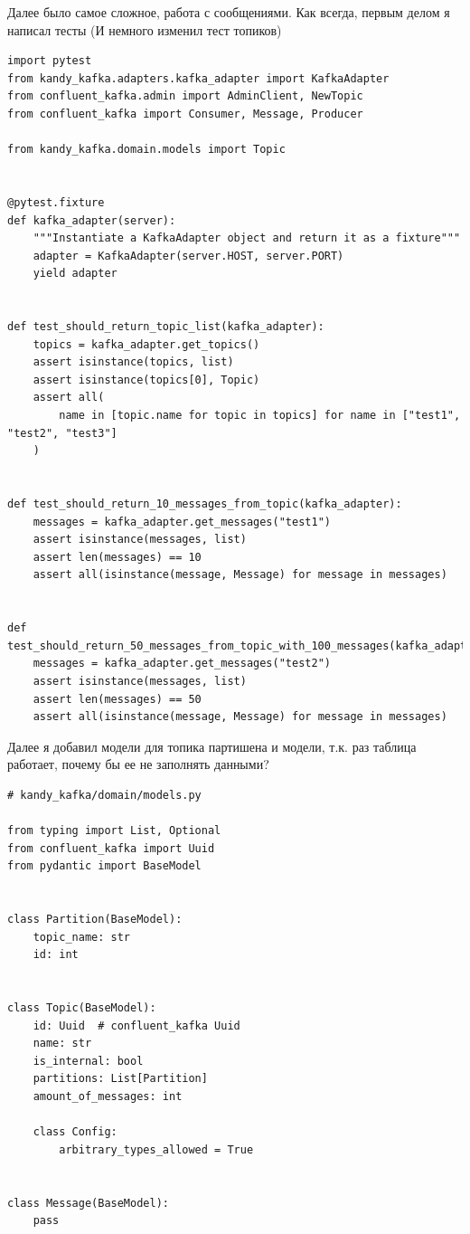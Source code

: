 \documentclass[10pt , a4paper]{report}
\newenvironment{code}{\captionsetup{type=listing}}{}
\begin{document}
Далее было самое сложное, работа с сообщениями. Как всегда, первым делом я написал тесты (И немного изменил тест топиков)

\begin{code}
  \begin{verbatim}
import pytest
from kandy_kafka.adapters.kafka_adapter import KafkaAdapter
from confluent_kafka.admin import AdminClient, NewTopic
from confluent_kafka import Consumer, Message, Producer

from kandy_kafka.domain.models import Topic


@pytest.fixture
def kafka_adapter(server):
    """Instantiate a KafkaAdapter object and return it as a fixture"""
    adapter = KafkaAdapter(server.HOST, server.PORT)
    yield adapter


def test_should_return_topic_list(kafka_adapter):
    topics = kafka_adapter.get_topics()
    assert isinstance(topics, list)
    assert isinstance(topics[0], Topic)
    assert all(
        name in [topic.name for topic in topics] for name in ["test1", "test2", "test3"]
    )


def test_should_return_10_messages_from_topic(kafka_adapter):
    messages = kafka_adapter.get_messages("test1")
    assert isinstance(messages, list)
    assert len(messages) == 10
    assert all(isinstance(message, Message) for message in messages)


def test_should_return_50_messages_from_topic_with_100_messages(kafka_adapter):
    messages = kafka_adapter.get_messages("test2")
    assert isinstance(messages, list)
    assert len(messages) == 50
    assert all(isinstance(message, Message) for message in messages)
  \end{verbatim}
\end{code}

Далее я добавил модели для топика партишена и модели, т.к. раз таблица работает, почему бы ее не заполнять данными? 

\begin{code}
  \begin{verbatim}
# kandy_kafka/domain/models.py

from typing import List, Optional
from confluent_kafka import Uuid
from pydantic import BaseModel


class Partition(BaseModel):
    topic_name: str
    id: int


class Topic(BaseModel):
    id: Uuid  # confluent_kafka Uuid
    name: str
    is_internal: bool
    partitions: List[Partition]
    amount_of_messages: int

    class Config:
        arbitrary_types_allowed = True


class Message(BaseModel):
    pass
  \end{verbatim}
\end{code}
\end{document}
